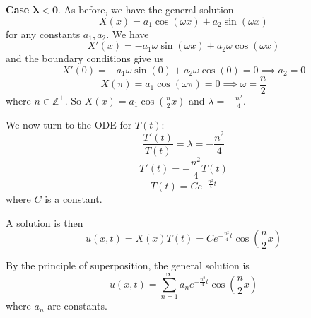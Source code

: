 \documentclass[plain]{pset}
\begin{document}
\begin{solution}
    \textbf{Case \(\mathbf{\lambda < 0}\)}.
    As before, we have the general solution
    \[X(x) = a_1\cos(\omega x) + a_2\sin(\omega x)\]
    for any constants \(a_1, a_2\).
    We have
    \[X'(x) = -a_1\omega\sin(\omega x) + a_2\omega\cos(\omega x)\]
    and the boundary conditions give us
    \[X'(0) = -a_1\omega\sin(0) + a_2\omega\cos(0) = 0 \implies a_2 = 0\]
    \[X(\pi) = a_1\cos(\omega\pi) = 0 \implies \omega = \frac{n}{2}\]
    where \(n \in \mathbb{Z}^+\). So \(X(x) = a_1\cos\left(\frac{n}{2}x\right)\) and \(\lambda = -\frac{n^2}{4}\).

    We now turn to the ODE for \(T(t)\):
    \[\frac{T'(t)}{T(t)} = \lambda = -\frac{n^2}{4}\]
    \[T'(t) = -\frac{n^2}{4}T(t)\]
    \[T(t) = Ce^{-\frac{n^2}{4}t}\]
    where \(C\) is a constant.

    A solution is then
    \[u(x, t) = X(x)T(t) = Ce^{-\frac{n^2}{4}t}\cos\left(\frac{n}{2}x\right)\]

    By the principle of superposition, the general solution is
    \[u(x, t) = \sum_{n=1}^\infty a_n e^{-\frac{n^2}{4}t}\cos\left(\frac{n}{2}x\right)\]
    where \(a_n\) are constants.

\end{solution}
\end{document}
